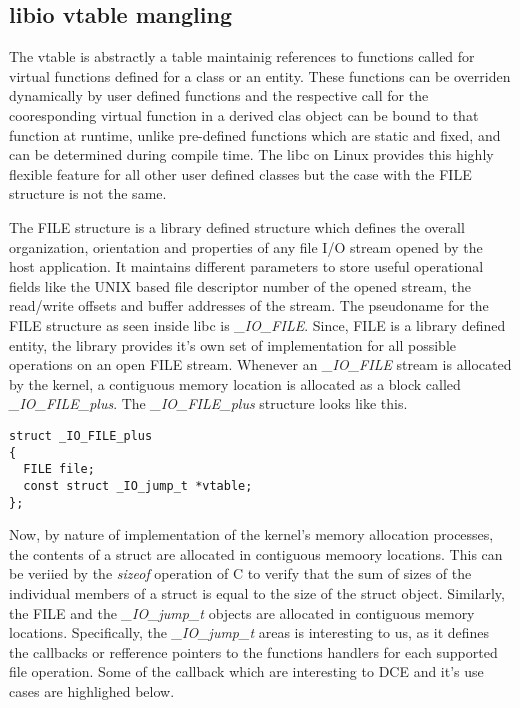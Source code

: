 \documentclass{sig-alternate}
\begin{document}
\subsection{libio vtable mangling}
The vtable is abstractly a table maintainig references to functions called for virtual functions defined for a class or an entity. These functions can 
be overriden dynamically by user defined functions and the respective call for the cooresponding virtual function in a derived clas object can be bound 
to that function at runtime, unlike pre-defined functions which are static and fixed, and can be determined during compile time. The libc on Linux provides
this highly flexible feature for all other user defined classes but the case with the FILE structure is not the same.


The FILE structure is a library defined structure which defines the overall organization, orientation and properties of any file I/O stream opened
by the host application. It maintains different parameters to store useful operational fields like the UNIX based file descriptor number of the 
opened stream, the read/write offsets and buffer addresses of the stream. The pseudoname for the FILE structure as seen inside libc is \textit{\_IO\_FILE}. 
Since, FILE is a library defined entity, the library provides it's own set of implementation for all possible operations on an open FILE stream.
Whenever an \textit{\_IO\_FILE} stream is allocated by the kernel, a contiguous memory location is allocated as a block called \textit{\_IO\_FILE\_plus}. 
The \textit{\_IO\_FILE\_plus} structure looks like this.

\begin{lstlisting}[style=CStyle]     
struct _IO_FILE_plus
{
  FILE file;
  const struct _IO_jump_t *vtable;
};
\end{lstlisting}

Now, by nature of implementation of the kernel's memory allocation processes, the contents of a struct are allocated in contiguous memoory locations. 
This can be veriied by the \textit{sizeof} operation of C to verify that the sum of sizes of the individual members of a struct is equal to the size of
the struct object. Similarly, the FILE and the \textit{\_IO\_jump\_t} objects are allocated in contiguous memory locations. Specifically, the 
\textit{\_IO\_jump\_t} areas is interesting to us, as it defines the callbacks or refference pointers to the functions handlers for each supported file 
operation. Some of the callback which are interesting to DCE and it's use cases are highlighed below.
\end{document}
